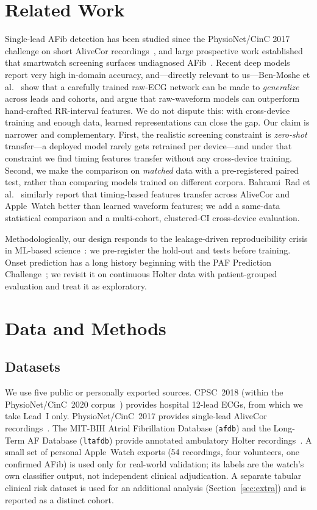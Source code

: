 \section{Related Work}
Single-lead AFib detection has been studied since the PhysioNet/CinC 2017
challenge on short AliveCor recordings~\cite{clifford2017af}, and large
prospective work established that smartwatch screening surfaces undiagnosed
AFib~\cite{perez2019appleheart}. Recent deep models report very high in-domain
accuracy, and---directly relevant to us---Ben-Moshe et
al.~\cite{benmoshe2024rawecgnet} show that a carefully trained raw-ECG network can
be made to \emph{generalize} across leads and cohorts, and argue that raw-waveform
models can outperform hand-crafted RR-interval features. We do not dispute this:
with cross-device training and enough data, learned representations can close the
gap. Our claim is narrower and complementary. First, the realistic screening
constraint is \emph{zero-shot} transfer---a deployed model rarely gets retrained
per device---and under that constraint we find timing features transfer without
any cross-device training. Second, we make the comparison on \emph{matched} data
with a pre-registered paired test, rather than comparing models trained on
different corpora. Bahrami~Rad et al.~\cite{bahramirad2024crowdsourced} similarly
report that timing-based features transfer across AliveCor and Apple~Watch better
than learned waveform features; we add a same-data statistical comparison and a
multi-cohort, clustered-CI cross-device evaluation.

Methodologically, our design responds to the leakage-driven reproducibility
crisis in ML-based science~\cite{kapoor2023leakage}: we pre-register the hold-out
and tests before training. Onset prediction has a long history beginning with the
PAF Prediction Challenge~\cite{moody2001paf}; we revisit it on continuous Holter
data with patient-grouped evaluation and treat it as exploratory.

\section{Data and Methods}

\subsection{Datasets}
We use five public or personally exported sources. CPSC~2018 (within the
PhysioNet/CinC~2020 corpus~\cite{alday2020classification}) provides hospital
12-lead ECGs, from which we take Lead~I only. PhysioNet/CinC~2017 provides
single-lead AliveCor recordings~\cite{clifford2017af}. The MIT-BIH Atrial
Fibrillation Database (\texttt{afdb}) and the Long-Term AF Database
(\texttt{ltafdb}) provide annotated ambulatory Holter
recordings~\cite{moody1983afdb,petrutiu2007ltaf,goldberger2000physionet}. A small
set of personal Apple~Watch exports (54 recordings, four volunteers, one confirmed
AFib) is used only for real-world validation; its labels are the watch's own
classifier output, not independent clinical adjudication. A separate tabular
clinical risk dataset is used for an additional analysis (Section~\ref{sec:extra})
and is reported as a distinct cohort.

